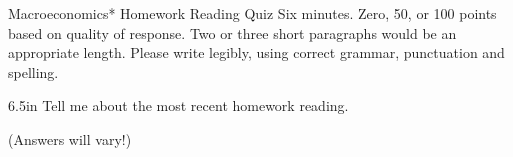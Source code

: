 \documentclass[12pt]{exam}
\begin{document}
\FontEasyRead

\Heading
{Macroeconomics*}
{Homework Reading Quiz}
{Six minutes.
  Zero, 50, or 100 points based on quality of response.
  Two or three short paragraphs would be an appropriate length.
Please write legibly, using correct grammar, punctuation and spelling.}

\begin{questions}

  \begin{shortanswer}[100]{6.5in}
    Tell me about the most recent homework reading.
  \end{shortanswer}
  \begin{solution}
    (Answers will vary!)
  \end{solution}

\end{questions}
\end{document}
